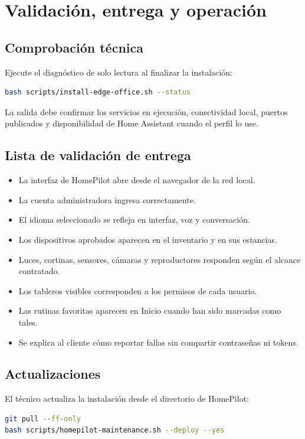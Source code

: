 \section{Validación, entrega y operación}

\subsection{Comprobación técnica}
Ejecute el diagnóstico de solo lectura al finalizar la instalación:
\begin{lstlisting}[language=bash]
bash scripts/install-edge-office.sh --status
\end{lstlisting}

La salida debe confirmar los servicios en ejecución, conectividad local, puertos publicados y disponibilidad de Home Assistant cuando el perfil lo use.

\subsection{Lista de validación de entrega}
\begin{itemize}[itemsep=0.15cm]
    \item La interfaz de HomePilot abre desde el navegador de la red local.
    \item La cuenta administradora ingresa correctamente.
    \item El idioma seleccionado se refleja en interfaz, voz y conversación.
    \item Los dispositivos aprobados aparecen en el inventario y en sus estancias.
    \item Luces, cortinas, sensores, cámaras y reproductores responden según el alcance contratado.
    \item Los tableros visibles corresponden a los permisos de cada usuario.
    \item Las rutinas favoritas aparecen en Inicio cuando han sido marcadas como tales.
    \item Se explica al cliente cómo reportar fallas sin compartir contraseñas ni tokens.
\end{itemize}

\subsection{Actualizaciones}
El técnico actualiza la instalación desde el directorio de HomePilot:
\begin{lstlisting}[language=bash]
git pull --ff-only
bash scripts/homepilot-maintenance.sh --deploy --yes
\end{lstlisting}

